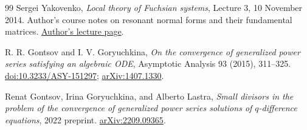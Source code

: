 \documentclass[11pt,a4paper]{article}
\numberwithin{equation}{section}
\theoremstyle{definition}
\theoremstyle{remark}
\begin{document}
\begin{thebibliography}{99}
Sergei Yakovenko, \emph{Local theory of Fuchsian systems}, Lecture 3,
10 November 2014. Author's course notes on resonant normal forms and their
fundamental matrices.
\href{https://yakovenko.wordpress.com/2014/11/10/lecture-3-nov-10-2014/}{Author's lecture page}.

R. R. Gontsov and I. V. Goryuchkina,
\emph{On the convergence of generalized power series satisfying an
algebraic ODE}, Asymptotic Analysis 93 (2015), 311--325.
\href{https://doi.org/10.3233/ASY-151297}{doi:10.3233/ASY-151297};
\href{https://arxiv.org/abs/1407.1330}{arXiv:1407.1330}.

Renat Gontsov, Irina Goryuchkina, and Alberto Lastra,
\emph{Small divisors in the problem of the convergence of generalized
power series solutions of $q$-difference equations}, 2022 preprint.
\href{https://arxiv.org/abs/2209.09365}{arXiv:2209.09365}.

\end{thebibliography}
\end{document}
